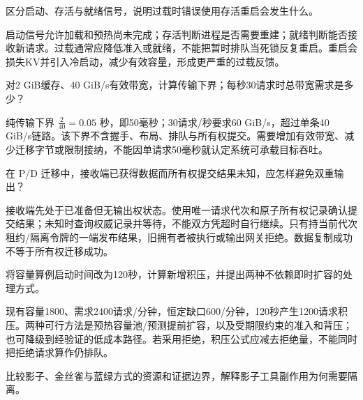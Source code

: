 \begin{exercises}
\begin{exercise} 区分启动、存活与就绪信号，说明过载时错误使用存活重启会发生什么。

\begin{solution}
启动信号允许加载和预热尚未完成；存活判断进程是否需要重建；就绪判断能否接收新请求。过载通常应降低准入或就绪，不能把暂时排队当死锁反复重启。重启会损失KV并引入冷启动，减少有效容量，形成更严重的过载反馈。
\end{solution}
\end{exercise}

\begin{exercise}\optional 对2 GiB缓存、40 GiB/s有效带宽，计算传输下界；每秒30请求时总带宽需求是多少？

\begin{solution}
纯传输下界 $\frac{2}{40}=0.05$ 秒，即50毫秒；30请求/秒要求60 GiB/s，超过单条40 GiB/s链路。该下界不含握手、布局、排队与所有权提交。需要增加有效带宽、减少迁移字节或限制接纳，不能因单请求50毫秒就认定系统可承载目标吞吐。
\end{solution}
\end{exercise}

\begin{exercise}\optional 在 P/D 迁移中，接收端已获得数据而所有权提交结果未知，应怎样避免双重输出？

\begin{solution}
接收端先处于已准备但无输出权状态。使用唯一请求代次和原子所有权记录确认提交结果；未知时查询权威记录并等待，不能双方凭超时自行继续。只有持当前代次租约/隔离令牌的一端发布结果，旧拥有者被执行或输出网关拒绝。数据复制成功不等于所有权迁移成功。
\end{solution}
\end{exercise}

\begin{exercise} 将容量算例启动时间改为120秒，计算新增积压，并提出两种不依赖即时扩容的处理方式。

\begin{solution}
现有容量1800、需求2400请求/分钟，恒定缺口600/分钟，120秒产生1200请求积压。两种可行方法是预热容量池/预测提前扩容，以及受期限约束的准入和背压；也可降级到经验证的低成本路径。若采用拒绝，积压公式应减去拒绝量，不能同时把拒绝请求算作仍排队。
\end{solution}
\end{exercise}

\begin{exercise} 比较影子、金丝雀与蓝绿方式的资源和证据边界，解释影子工具副作用为何需要隔离。


\end{exercise}
\end{exercises}
